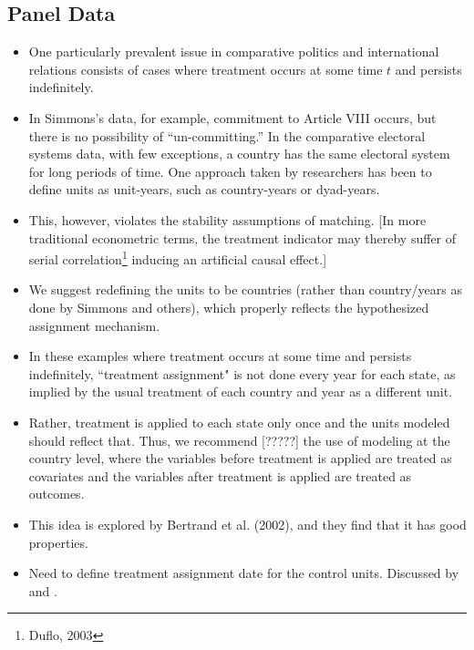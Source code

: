 \documentclass[11pt,titlepage]{article}
\begin{document}
\subsection{Panel Data}
\begin{itemize}
\item One particularly prevalent issue in comparative politics and
  international relations consists of cases where treatment occurs at
  some time $t$ and persists indefinitely.
\item In Simmons's data, for example, commitment to Article VIII
  occurs, but there is no possibility of ``un-committing.''  In the
  comparative electoral systems data, with few exceptions, a country
  has the same electoral system for long periods of time.  One
  approach taken by researchers has been to define units as
  unit-years, such as country-years or dyad-years.
\item This, however, violates the stability assumptions of matching.
  [In more traditional econometric terms, the treatment indicator may
  thereby suffer of serial correlation\footnote{Duflo, 2003} inducing
  an artificial causal effect.]
\item We suggest redefining the units to be countries (rather than
  country/years as done by Simmons and others), which properly
  reflects the hypothesized assignment mechanism.
\item In these examples where treatment occurs at some time and
  persists indefinitely, ``treatment assignment" is not done every
  year for each state, as implied by the usual treatment of each
  country and year as a different unit.
\item Rather, treatment is applied to each state only once and the
  units modeled should reflect that.  Thus, we recommend [?????] the
  use of modeling at the country level, where the variables before
  treatment is applied are treated as covariates and the variables
  after treatment is applied are treated as outcomes.
\item This idea is explored by Bertrand et al. (2002), and they find
  that it has good properties.
\item Need to define treatment assignment date for the control units.
  Discussed by \cite{Rubin91} and \cite{Sianesi04}.
\end{itemize} 
\end{document}
